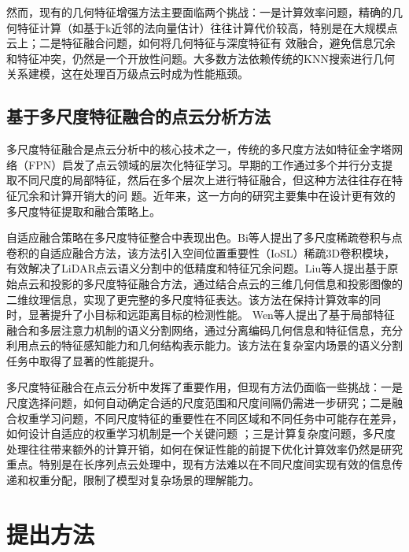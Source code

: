 \documentclass[preprint,12pt]{elsarticle}
\begin{document}
然而，现有的几何特征增强方法主要面临两个挑战：一是计算效率问题，精确的几何特征计算（如基于k近邻的法向量估计）往往计算代价较高，特别是在大规模点云上；二是特征融合问题，如何将几何特征与深度特征有     
效融合，避免信息冗余和特征冲突，仍然是一个开放性问题。大多数方法依赖传统的KNN搜索进行几何关系建模，这在处理百万级点云时成为性能瓶颈。

  \subsection{基于多尺度特征融合的点云分析方法}
多尺度特征融合是点云分析中的核心技术之一，传统的多尺度方法如特征金字塔网络（FPN）启发了点云领域的层次化特征学习。早期的工作通过多个并行分支提取不同尺度的局部特征，然后在多个层次上进行特征融合，但这种方法往往存在特征冗余和计算开销大的问     
题。近年来，这一方向的研究主要集中在设计更有效的多尺度特征提取和融合策略上。

自适应融合策略在多尺度特征整合中表现出色。Bi等人\cite{adaptive_fusion_2025}提出了多尺度稀疏卷积与点卷积的自适应融合方法，该方法引入空间位置重要性（IoSL）稀疏3D卷积模块，有效解决了LiDAR点云语义分割中的低精度和特征冗余问题。Liu等人\cite{projection_based_fusion_2024}提出基于原始点云和投影的多尺度特征融合方法，通过结合点云的三维几何信息和投影图像的二维纹理信息，实现了更完整的多尺度特征表达。该方法在保持计算效率的同   时，显著提升了小目标和远距离目标的检测性能。
Wen等人\cite{local_feature_fusion_2024}提出了基于局部特征融合和多层注意力机制的语义分割网络，通过分离编码几何信息和特征信息，充分利用点云的特征感知能力和几何结构表示能力。该方法在复杂室内场景的语义分割任务中取得了显著的性能提升。

多尺度特征融合在点云分析中发挥了重要作用，但现有方法仍面临一些挑战\cite{multiscale_survey_2024}：一是尺度选择问题，如何自动确定合适的尺度范围和尺度间隔仍需进一步研究；二是融合权重学习问题，不同尺度特征的重要性在不同区域和不同任务中可能存在差异，如何设计自适应的权重学习机制是一个关键问题     
；三是计算复杂度问题，多尺度处理往往带来额外的计算开销，如何在保证性能的前提下优化计算效率仍然是研究重点。特别是在长序列点云处理中，现有方法难以在不同尺度间实现有效的信息传递和权重分配，限制了模型对复杂场景的理解能力。






\section{提出方法}
\end{document}
